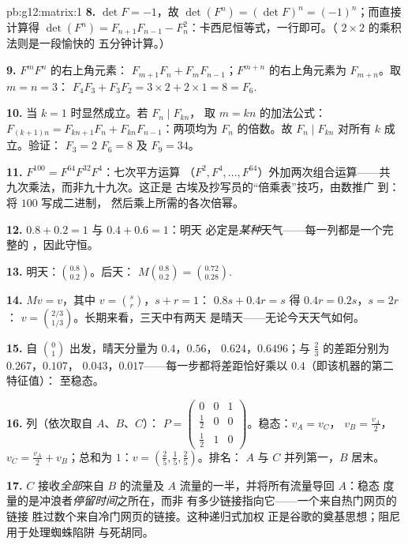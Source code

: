 \begin{solution}{pb:g12:matrix:1}
\textbf{8.} $\det F = -1$，故
$\det(F^n) = (\det F)^n = (-1)^n$；而直接计算得
$\det(F^n) = F_{n+1}F_{n-1} - F_n^2$：卡西尼恒等式，一行即可。（
$2 \times 2$ 的乘积法则是一段愉快的
五分钟计算。）

\textbf{9.} $F^m F^n$ 的右上角元素：
$F_{m+1}F_n + F_m F_{n-1}$；$F^{m+n}$ 的右上角元素为
$F_{m+n}$。取 $m = n = 3$：
$F_4 F_3 + F_3 F_2 = 3 \times 2 + 2 \times 1 = 8 = F_6$.

\textbf{10.} 当 $k = 1$ 时显然成立。若 $F_n \mid F_{kn}$，
取 $m = kn$ 的加法公式：
$F_{(k+1)n} = F_{kn+1}F_n + F_{kn}F_{n-1}$：两项均为
$F_n$ 的倍数。故 $F_n \mid F_{kn}$ 对所有 $k$ 成立。验证：
$F_3 = 2$  $F_6 = 8$ 及 $F_9 = 34$。

\textbf{11.} $F^{100} = F^{64} F^{32} F^4$：七次平方运算
（$F^2, F^4, \dots, F^{64}$）外加两次组合运算——共
九次乘法，而非九十九次。这正是
古埃及抄写员的“倍乘表”技巧，由数推广
到：将 $100$ 写成二进制，
然后乘上所需的各次倍幂。

\textbf{12.} $0.8 + 0.2 = 1$ 与 $0.4 + 0.6 = 1$：明天
必定是\emph{某种}天气——每一列都是一个完整的
，因此守恒。

\textbf{13.} 明天：$\binom{0.8}{0.2}$。后天：
$M\binom{0.8}{0.2} = \binom{0.72}{0.28}$.

\textbf{14.} $Mv = v$，其中 $v = \binom{s}{r}$，$s + r = 1$：
$0.8s + 0.4r = s$ 得 $0.4r = 0.2s$，$s = 2r$：
$v = \binom{2/3}{1/3}$。长期来看，三天中有两天
是晴天——无论今天天气如何。

\textbf{15.} 自 $\binom01$ 出发，晴天分量为 $0.4$，$0.56$，
$0.624$，$0.6496$；与 $\frac23$ 的差距分别为 $0.267$，$0.107$，
$0.043$，$0.017$——每一步都将差距恰好乘以
$0.4$（即该机器的第二特征值）：
至稳态。

\textbf{16.} 列（依次取自 $A$、$B$、$C$）：
$P = \begin{pmatrix} 0 & 0 & 1\\ \frac12 & 0 & 0\\
\frac12 & 1 & 0\end{pmatrix}$。稳态：$v_A = v_C$，
$v_B = \frac{v_A}{2}$，$v_C = \frac{v_A}{2} + v_B$；总和为
$1$：$v = \left(\frac25, \frac15, \frac25\right)$。排名：
$A$ 与 $C$ 并列第一，$B$ 居末。

\textbf{17.} $C$ 接收\emph{全部}来自 $B$ 的流量及
$A$ 流量的一半，并将所有流量导回 $A$：稳态
度量的是冲浪者\emph{停留时间}之所在，而非
有多少链接指向它——一个来自热门网页的链接
胜过数个来自冷门网页的链接。这种递归式加权
正是谷歌的奠基思想；阻尼用于处理蜘蛛陷阱
与死胡同。


\end{solution}
